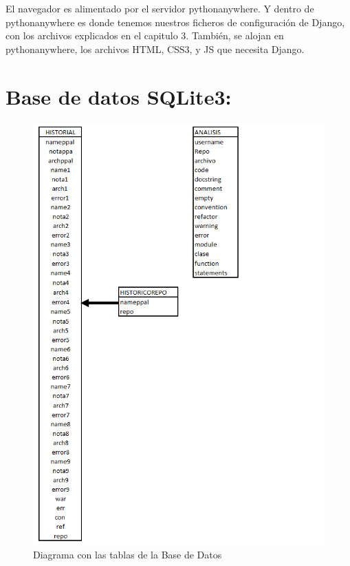 \documentclass[a4paper, 12pt]{book}
\begin{document}
El navegador es alimentado por el servidor pythonanywhere. Y dentro de pythonanywhere es donde tenemos nuestros ficheros de configuración de Django, con los archivos explicados en el capitulo 3. También, se alojan en pythonanywhere, los archivos HTML, CSS3, y JS que necesita Django.

\section{Base de datos SQLite3: } 

\begin{figure}[H]
\centering
\includegraphics[scale=0.6]{img/tablasBBDD.png} 
\caption{Diagrama con las tablas de la Base de Datos}
\end{figure}
\end{document}
